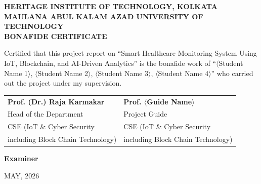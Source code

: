 \newpage
\thispagestyle{empty}
\begin{center}
{\Large\bfseries HERITAGE INSTITUTE OF TECHNOLOGY, KOLKATA\\[0.5cm]}
{\large\bfseries MAULANA ABUL KALAM AZAD UNIVERSITY OF TECHNOLOGY\\[3cm]}
{\LARGE\bfseries BONAFIDE CERTIFICATE\\[1.5cm]}
\end{center}

\noindent
Certified that this project report on ``Smart Healthcare Monitoring System Using IoT, Blockchain, and AI-Driven Analytics'' is the bonafide work of ``$\langle$Student Name 1$\rangle$, $\langle$Student Name 2$\rangle$, $\langle$Student Name 3$\rangle$, $\langle$Student Name 4$\rangle$'' who carried out the project under my supervision.

\vspace{5cm}

\noindent
\begin{tabular}{@{}p{}p{}@{}}
\textbf{Prof. (Dr.) Raja Karmakar} & \textbf{Prof. $\langle$Guide Name$\rangle$} \\
Head of the Department & Project Guide \\
CSE (IoT \& Cyber Security & CSE (IoT \& Cyber Security \\
including Block Chain Technology) & including Block Chain Technology) \\
\end{tabular}

\vspace{4cm}
\noindent\textbf{Examiner}

\vspace{1cm}
\begin{center}
MAY, 2026
\end{center}
